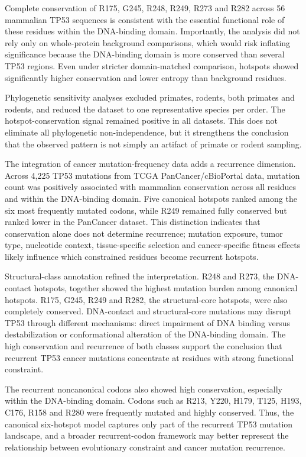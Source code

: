 \documentclass[namedate,webpdf,contemporary,large]{oup-authoring-template}
\begin{document}
Complete conservation of R175, G245, R248, R249, R273 and R282 across 56 mammalian TP53 sequences is consistent with the essential functional role of these residues within the DNA-binding domain. Importantly, the analysis did not rely only on whole-protein background comparisons, which would risk inflating significance because the DNA-binding domain is more conserved than several TP53 regions. Even under stricter domain-matched comparison, hotspots showed significantly higher conservation and lower entropy than background residues.

Phylogenetic sensitivity analyses excluded primates, rodents, both primates and rodents, and reduced the dataset to one representative species per order. The hotspot-conservation signal remained positive in all datasets. This does not eliminate all phylogenetic non-independence, but it strengthens the conclusion that the observed pattern is not simply an artifact of primate or rodent sampling.

The integration of cancer mutation-frequency data adds a recurrence dimension. Across 4,225 TP53 mutations from TCGA PanCancer/cBioPortal data, mutation count was positively associated with mammalian conservation across all residues and within the DNA-binding domain. Five canonical hotspots ranked among the six most frequently mutated codons, while R249 remained fully conserved but ranked lower in the PanCancer dataset. This distinction indicates that conservation alone does not determine recurrence; mutation exposure, tumor type, nucleotide context, tissue-specific selection and cancer-specific fitness effects likely influence which constrained residues become recurrent hotspots.

Structural-class annotation refined the interpretation. R248 and R273, the DNA-contact hotspots, together showed the highest mutation burden among canonical hotspots. R175, G245, R249 and R282, the structural-core hotspots, were also completely conserved. DNA-contact and structural-core mutations may disrupt TP53 through different mechanisms: direct impairment of DNA binding versus destabilization or conformational alteration of the DNA-binding domain. The high conservation and recurrence of both classes support the conclusion that recurrent TP53 cancer mutations concentrate at residues with strong functional constraint.

The recurrent noncanonical codons also showed high conservation, especially within the DNA-binding domain. Codons such as R213, Y220, H179, T125, H193, C176, R158 and R280 were frequently mutated and highly conserved. Thus, the canonical six-hotspot model captures only part of the recurrent TP53 mutation landscape, and a broader recurrent-codon framework may better represent the relationship between evolutionary constraint and cancer mutation recurrence.
\end{document}
